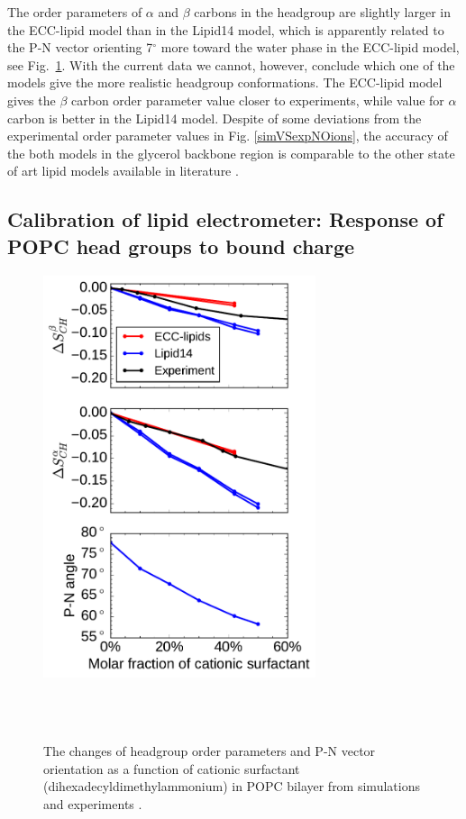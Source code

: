 \documentclass[aip,jcp,twocolumn]{revtex4}
\begin{document}
The order parameters of $\alpha$ and $\beta$ carbons in the headgroup are slightly larger
in the ECC-lipid model than in the Lipid14 model, which is apparently related to the
P-N vector orienting 7$^{\circ}$ more toward the water phase in the ECC-lipid model, 
see Fig.~\ref{OrderParameterCHANGESsurf}. With the current data we cannot,
however, conclude which one of the models give the more realistic
headgroup conformations. The ECC-lipid model gives
the $\beta$ carbon order parameter value closer to experiments, while
value for $\alpha$ carbon is better in the Lipid14 model.
Despite of some deviations from the experimental order parameter values
in Fig. \ref{simVSexpNOions},
the accuracy of the both models in the glycerol backbone region
is comparable to the other state
of art lipid models available in literature \cite{botan15}.



\subsection{Calibration of lipid electrometer:
            Response of POPC head groups to bound charge}\label{section:boundCHARGE}

\begin{figure}[tbp]
  \centering
  \includegraphics[width=8.0cm]{../Fig/ipython_nb/PN_angle_OrdPars-A-B_L14-ECCL17_q80_sig89_surf.pdf}
  \caption{\label{OrderParameterCHANGESsurf}
    The changes of headgroup order parameters and P-N vector orientation as a function of
    cationic surfactant (dihexadecyldimethylammonium) in POPC bilayer from simulations
    and experiments \cite{scherer89}.
  }
   \\
   \\
\end{figure}
\end{document}
